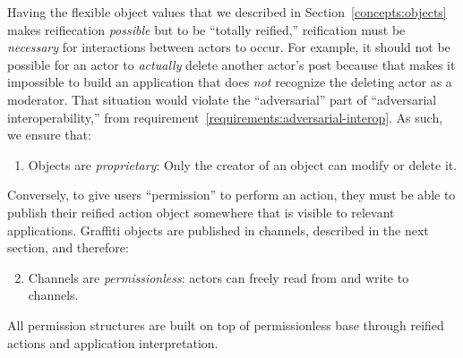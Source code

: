 

Having the flexible object values that we described in Section~\ref{concepts:objects}
makes reifiecation \emph{possible} but to be ``totally reified,''
reification must be \emph{necessary} for interactions between
actors to occur.
For example, it should not be possible for an actor to \emph{actually}
delete another actor's post because that makes it impossible to build
an application that does \emph{not} recognize the deleting actor as a moderator.
That situation would violate the ``adversarial'' part of ``adversarial interoperability,''
from requirement~\ref{requirements:adversarial-interop}.
As such, we ensure that:
\begin{enumerate}
\item
Objects are \emph{proprietary}: Only the creator of an object can modify or delete it.
\end{enumerate}
Conversely, to give users ``permission'' to perform an action,
they must be able to publish
their reified action object somewhere that is visible
to relevant applications.
Graffiti objects are published in channels, described in the next
section, and therefore:
\begin{enumerate}
\setcounter{enumi}{1}
\item
Channels are \emph{permissionless}: actors can freely read from and write to channels.
\end{enumerate}
All permission structures are built on top of permissionless base
through reified actions and application interpretation.


